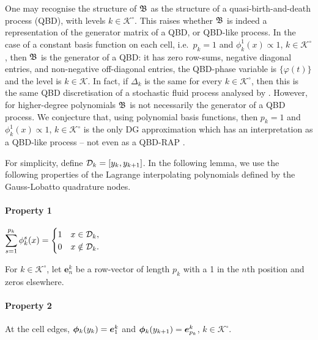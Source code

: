 	\begin{rem}
	One may recognise the structure of \( {  {\mathfrak{\boldsymbol B}}}\) as the structure of a quasi-birth-and-death process (QBD), with levels \(k\in\mathcal K^\circ\). This raises whether \( {  {\mathfrak{\boldsymbol B}}}\) is indeed a representation of the generator matrix of a QBD, or QBD-like process. In the case of a constant basis function on each cell, i.e.~\(p_k=1\) and \(\phi_k^1(x)\propto1\), \(k\in\mathcal K^\circ\), then \( {  {\mathfrak{\boldsymbol B}}}\) is the generator of a QBD: it has zero row-sums, negative diagonal entries, and non-negative off-diagonal entries, the QBD-phase variable is \(\{\varphi(t)\}\) and the level is \(k\in\mathcal K\). In fact, if \(\Delta_k\) is the same for every \(k\in\mathcal K^\circ\), then this is the same QBD discretisation of a stochastic fluid process analysed by \cite{bo2013}. However, for higher-degree polynomials \(\mathfrak{\boldsymbol B}\) is not necessarily the generator of a QBD process. We conjecture that, using polynomial basis functions, then \(p_k=1\) and \(\phi_k^1(x)\propto1\), \(k\in\mathcal K^\circ\) is the only DG approximation which has an interpretation as a QBD-like process -- not even as a QBD-RAP \citep{bn2010}.
	\end{rem}
	
	For simplicity, define \(\mathcal{D}_k=[y_k,y_{k+1}]\). In the following lemma, we use the following properties of the Lagrange interpolating polynomials defined by the Gauss-Lobatto quadrature nodes. 
	\paragraph{Property 1} \(\displaystyle\sum_{s=1}^{p_k} \phi_k^s(x) = \begin{cases} 1&x\in\mathcal{D}_k,\\ 0 & x\notin \mathcal{D}_k.\end{cases}\)

	For \(k\in\mathcal K^\circ\), let \(\boldsymbol e_n^k\) be a row-vector of length \(p_k\) with a 1 in the \(n\)th position and zeros elsewhere.
	\paragraph{Property 2} At the cell edges, \(\boldsymbol \phi_k(y_k) = \boldsymbol e_1^k\) and \(\boldsymbol\phi_k(y_{k+1})=\boldsymbol e_{p_k}^k\), \(k\in\mathcal K^\circ\). 

